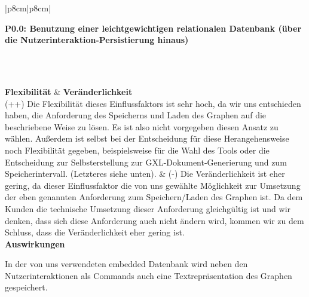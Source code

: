 \documentclass[enabledeprecatedfontcommands,fontsize=11pt,paper=a4,twoside]{scrartcl}
\newcounter{one}
\newcounter{two}[one]
\newcommand{\tone}{0\theone}
\newcommand{\two}{\stepcounter{two}0\thetwo}
\newcommand\s{\rule{0pt}{4ex}}
\begin{document}
\begin{tabular} {|p{8cm}|p{8cm}|}
	\hline
	 {\parbox{16cm}{\textbf{\hypertarget{e}{P\tone.\two}: Benutzung einer leichtgewichtigen relationalen Datenbank (über die Nutzerinteraktion-Persistierung hinaus)}} }\s \\ [2ex]\hline\hline 
	\rule{0pt}{11ex}\\ [3ex] \hline
	\textbf{Flexibilität}  & \textbf{Veränderlichkeit} \\
	(++) Die Flexibilität dieses Einflussfaktors ist sehr hoch, da wir uns entschieden haben, die Anforderung des Speicherns und Laden des Graphen auf die beschriebene Weise zu lösen. Es ist also nicht vorgegeben diesen Ansatz zu wählen. Außerdem ist selbst bei der Entscheidung für diese Herangehensweise noch Flexibilität gegeben, beispielsweise für die Wahl des Tools oder die Entscheidung zur Selbsterstellung zur GXL-Dokument-Generierung und zum Speicherintervall. (Letzteres siehe unten). & 
	(-) Die Veränderlichkeit ist eher gering, da dieser Einflussfaktor die von uns gewählte Möglichkeit zur Umsetzung der eben genannten Anforderung zum Speichern/Laden des Graphen ist. Da dem Kunden die technische Umsetzung dieser Anforderung gleichgültig ist und wir denken, dass sich diese Anforderung auch nicht ändern wird, kommen wir zu dem Schluss, dass die Veränderlichkeit eher gering ist.\\
	\hline
	 {\textbf{Auswirkungen}} \\
	 {\parbox{16cm}{In der von uns verwendeten embedded Datenbank wird neben den Nutzerinteraktionen als Commands auch eine Textrepräsentation des Graphen gespeichert.} }\\ \hline
\end{tabular}
\end{document}
